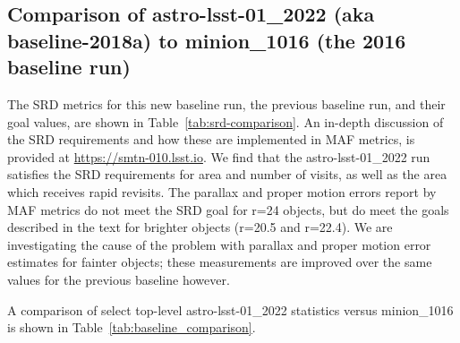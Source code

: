 \documentclass[DM,lsstdraft,authoryear,toc]{lsstdoc}
\begin{document}
\subsection{Comparison of astro-lsst-01\_2022 (aka baseline-2018a) to minion\_1016 (the 2016 baseline run)}

The SRD metrics for this new baseline run, the previous baseline run, and their goal values, are shown in Table~\ref{tab:srd-comparison}. An in-depth discussion of the SRD requirements and how these are implemented in MAF metrics, is provided at \url{https://smtn-010.lsst.io}. We find that the astro-lsst-01\_2022 run satisfies the SRD requirements for area and number of visits, as well as the area which receives rapid revisits.  The parallax and proper motion errors report by MAF metrics do not meet the SRD goal for r=24 objects, but do meet the goals described in the text for brighter objects (r=20.5 and r=22.4). We are investigating the cause of the problem with parallax and proper motion error estimates for fainter objects; these measurements are improved over the same values for the previous baseline however.

A comparison of select top-level astro-lsst-01\_2022 statistics versus minion\_1016 is shown in Table~\ref{tab:baseline_comparison}. 
\end{document}
